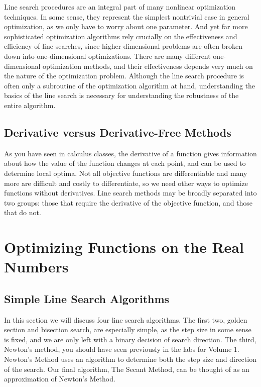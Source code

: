 Line search procedures are an integral part of many nonlinear optimization techniques.
In some sense, they represent the simplest nontrivial case in general optimization, as we only have to worry about one parameter.
And yet far more sophisticated optimization algorithms rely crucially on the effectiveness and efficiency of line searches, since higher-dimensional problems are often broken down into one-dimensional optimizations.
There are many different one-dimensional optimization methods, and their effectiveness depends very much on the nature of the optimization problem.
Although the line search procedure is often only a subroutine of the optimization algorithm at hand, understanding the basics of the line search is necessary for understanding the robustness of the entire algorithm.

\subsection*{Derivative versus Derivative-Free Methods} %

As you have seen in calculus classes, the derivative of a function gives information about how the value of the function changes at each point, and can be used to determine local optima.
Not all objective functions are differentiable and many more are difficult and costly to differentiate, so we need other ways to optimize functions without derivatives.
Line search methods may be broadly separated into two groups: those that require the derivative of the objective function, and those that do not.

\section*{Optimizing Functions on the Real Numbers}

\subsection*{Simple Line Search Algorithms}
In this section we will discuss four line search algorithms.
The first two, golden section and bisection search, are especially simple, as the step size in some sense is fixed, and we are only left with a binary decision of search direction.
The third, Newton's method, you should have seen previously in the labs for Volume 1.
Newton's Method uses an algorithm to determine both the step size and direction of the search.
Our final algorithm, The Secant Method, can be thought of as an approximation of Newton's Method.

